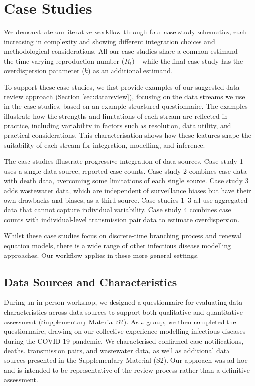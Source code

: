 \documentclass{article}
\begin{document}
\section{Case Studies}

We demonstrate our iterative workflow through four case study schematics, each increasing in complexity and showing different integration choices and methodological considerations. All our case studies share a common estimand -- the time-varying reproduction number ($R_t$) -- while the final case study has the overdispersion parameter ($k$) as an additional estimand.

To support these case studies, we first provide examples of our suggested data review approach (Section \ref{sec:datareview}), focusing on the data streams we use in the case studies, based on an example structured questionnaire.
The examples illustrate how the strengths and limitations of each stream are reflected in practice, including variability in factors such as resolution, data utility, and practical considerations. This characterisation shows how these features shape the suitability of each stream for integration, modelling, and inference.

The case studies illustrate progressive integration of data sources.
Case study 1 uses a single data source, reported case counts.
Case study 2 combines case data with death data, overcoming some limitations of each single source. Case study 3 adds wastewater data, which are independent of surveillance biases but have their own drawbacks and biases, as a third source. Case studies 1--3 all use aggregated data that cannot capture individual variability. Case study 4 combines case counts with individual-level transmission pair data to estimate overdispersion.

Whilst these case studies focus on discrete-time branching process and renewal equation models, there is a wide range of other infectious disease modelling approaches. Our workflow applies in these more general settings.

\subsection{Data Sources and Characteristics}

During an in-person workshop, we designed a questionnaire for evaluating data characteristics across data sources to support both qualitative and quantitative assessment (Supplementary Material S2).
As a group, we then completed the questionnaire, drawing on our collective experience modelling infectious diseases during the COVID-19 pandemic.
We characterised confirmed case notifications, deaths, transmission pairs, and wastewater data, as well as additional data sources presented in the Supplementary Material (S2). Our approach was ad hoc and is intended to be representative of the review process rather than a definitive assessment.
\end{document}
